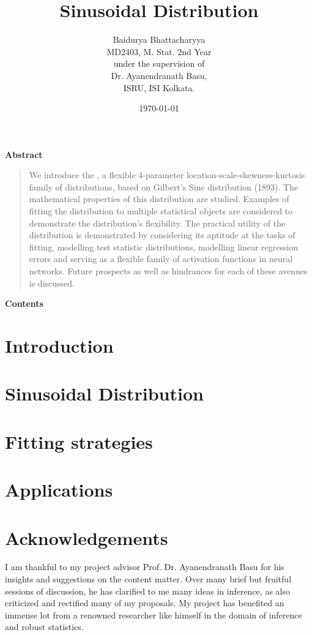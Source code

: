 \documentclass[11pt]{report}
\title{Sinusoidal Distribution}
\author{Baidurya Bhattacharyya\\
	MD2403, M. Stat. 2nd Year\\
{\small under the supervision of}\\
{\normalsize Dr. Ayanendranath Basu,\\
ISRU, ISI Kolkata.}}
\date{\today}
\theoremstyle{plain}
\theoremstyle{remark}
\theoremstyle{definition}
\begin{document}
\maketitle
\vspace*{2cm}
{\Large \textbf{Abstract}}
\begin{quotation}
	We introduce the \sindist{}, a flexible 4-parameter location-scale-skewness-kurtosis family of distributions, based on Gilbert's Sine distribution (1893). The mathematical properties of this distribution are studied. Examples of fitting the distribution to multiple statistical objects are considered to demonstrate the distribution's flexibility. The practical utility of the distribution is demonstrated by considering its aptitude at the tasks of fitting, modelling test statistic distributions, modelling linear regression errors and serving as a flexible family of activation functions in neural networks. Future prospects as well as hindrances for each of these avenues is discussed.
\end{quotation}
\makeatletter
\renewcommand\tableofcontents{%
	\@starttoc{toc}%
}
\makeatother
\vspace*{2cm}
{\Large \textbf{Contents}}
{\let\clearpage\relax \tableofcontents}
\chapter{Introduction}

\chapter{Sinusoidal Distribution}




\chapter{Fitting strategies}


\chapter{Applications}



%



\printbibliography



\chapter*{Acknowledgements}
I am thankful to my project advisor Prof. Dr. Ayanendranath Basu for his insights and suggestions on the content matter. Over many brief but fruitful sessions of discussion, he has clarified to me many ideas in inference, as also criticized and rectified many of my proposals. My project has benefited an immense lot from a renowned researcher like himself in the domain of inference and robust statistics.
\end{document}
